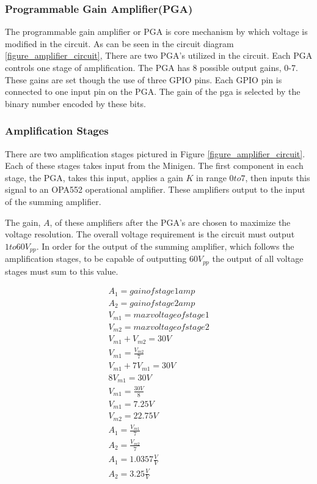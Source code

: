 \documentclass{article}	%
\begin{document}
\begin{multicols}{2}
\subsubsection{Programmable Gain Amplifier(PGA)}
The programmable gain amplifier or PGA is 
core mechanism by which voltage is modified in the circuit.
As can be seen in the circuit diagram \ref{figure_amplifier_circuit},
There are two PGA's utilized in the circuit.
Each PGA controls one stage of amplification.
The PGA has 8 possible output gains, 0-7.
These gains are set though the use of three GPIO pins.
Each GPIO pin is connected to one input pin on the PGA.
The gain of the pga is selected by the binary number encoded by 
these bits.

\subsubsection{Amplification Stages}
There are two amplification stages pictured in
Figure \ref{figure_amplifier_circuit}.
Each of these stages takes input from the Minigen.
The first component in each stage, the PGA,
takes this input,
applies a gain $K$ in range $0 to 7$, then
inputs this signal to an OPA552 operational amplifier.
These amplifiers output to the input of the summing amplifier.

The gain, $A$, of these amplifiers after the PGA's are chosen
to maximize the voltage resolution.
The overall voltage requirement is the circuit must output $1 to 60V_{pp}$.
In order for the output of the summing amplifier,
which follows the amplification stages,
to be capable of outputting $60V_{pp}$ the output of all voltage
stages must sum to this value.

\begin{gather*}
A_1 = gain of stage 1 amp \\ 
A_2 = gain of stage 2 amp\\
V_{m1} = max voltage of stage 1\\
V_{m2} = max voltage of stage 2\\
V_{m1} + V_{m2} = 30V\\
V_{m1} = \frac{V_{m2}}{7}\\
V_{m1} + 7V_{m1} = 30V\\
8V_{m1} = 30V\\
V_{m1} = \frac{30V}{8}\\
V_{m1} = 7.25V\\
V_{m2} = 22.75V\\
A_1 = \frac{V_{m1}}{7}\\
A_2 = \frac{V_{m2}}{7}\\
A_1 = 1.0357\frac{V}{V}\\
A_2 = 3.25\frac{V}{V}\\
\end{gather*}


\end{multicols}
\end{document}

